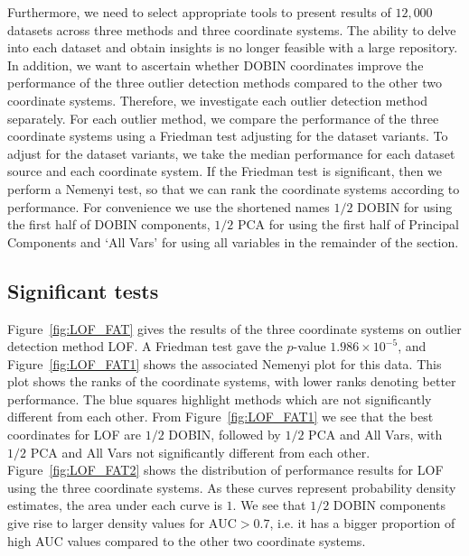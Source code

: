 \documentclass[11pt]{article}
\begin{document}
Furthermore, we need to select appropriate tools to present results of $12,000$ datasets across three methods and three coordinate systems. The ability to delve into each dataset and obtain  insights is no longer feasible with a large repository.  In addition, we want to ascertain whether DOBIN coordinates improve the performance of the three outlier detection methods compared to the other two coordinate systems. Therefore, we investigate each outlier detection method separately. For each outlier method, we compare the performance of the three coordinate systems using a Friedman test adjusting for the dataset variants. To adjust for the dataset variants, we take the median performance for each dataset source and each coordinate system.  If the Friedman test is significant, then we perform a Nemenyi test, so that we can rank the  coordinate systems according to performance. For convenience we use the shortened names $1/2$ DOBIN for using the first half of DOBIN components, $1/2$ PCA for using the first half of Principal Components and `All Vars' for using all variables in the remainder of the section.   

\subsection{Significant tests}\label{sec:DatRepo1}

Figure~\ref{fig:LOF_FAT} gives the results of the three coordinate systems on  outlier detection method LOF. A Friedman test gave the $p$-value $1.986 \times 10^{-5}$, and Figure~\ref{fig:LOF_FAT1} shows the associated Nemenyi plot for this data. This plot shows the ranks of the coordinate systems, with lower ranks denoting better performance. The blue squares highlight methods which are not significantly different from each other. From Figure~\ref{fig:LOF_FAT1} we see that the best coordinates for LOF are $1/2$ DOBIN, followed by $1/2$ PCA and All Vars, with $1/2$ PCA and  All Vars not significantly different from each other. 
Figure~\ref{fig:LOF_FAT2} shows the distribution of performance results for LOF using the three coordinate systems. As these curves represent probability density estimates, the area under each curve is $1$. We see that $1/2$ DOBIN components give rise to larger density values for $\text{AUC} > 0.7$, i.e. it has a bigger proportion of high AUC values compared to the other two coordinate systems. \\   
\end{document}

